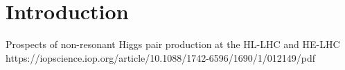 \chapter{Introduction}


Prospects of non-resonant Higgs pair production
at the HL-LHC and HE-LHC
https://iopscience.iop.org/article/10.1088/1742-6596/1690/1/012149/pdf